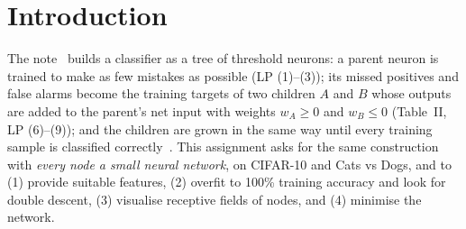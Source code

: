 \section{Introduction}
The note~\cite{note} builds a classifier as a tree of threshold neurons: a parent neuron is trained
to make as few mistakes as possible (LP (1)--(3)); its missed positives and false alarms become the
training targets of two children $A$ and $B$ whose outputs are added to the parent's net input with
weights $w_A\ge0$ and $w_B\le0$ (Table~II, LP (6)--(9)); and the children are grown in the same way
until every training sample is classified correctly~\cite{martinelli,svmtree}. This assignment asks
for the same construction with \emph{every node a small neural network}, on CIFAR-10 and Cats vs Dogs,
and to (1) provide suitable features, (2) overfit to 100\% training accuracy and look for double
descent, (3) visualise receptive fields of nodes, and (4) minimise the network.

